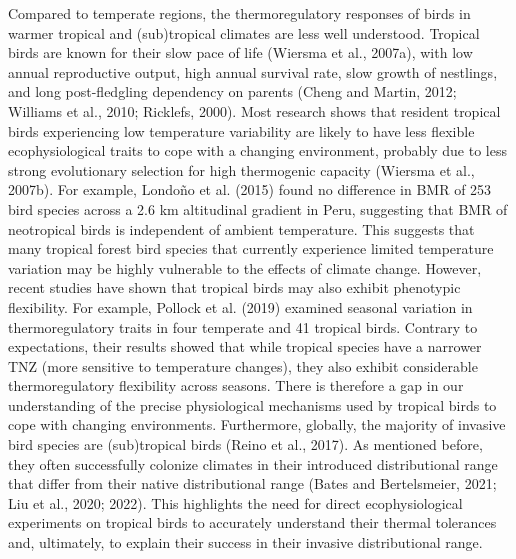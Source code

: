 \documentclass[10pt, twoside]{book} %
\begin{document}
Compared to temperate regions, the thermoregulatory responses of birds in warmer tropical and (sub)tropical climates are less well understood. Tropical birds are known for their slow pace of life (Wiersma et al., 2007a), with low annual reproductive output, high annual survival rate, slow growth of nestlings, and long post-fledgling dependency on parents (Cheng and Martin, 2012; Williams et al., 2010; Ricklefs, 2000). Most research shows that resident tropical birds experiencing low temperature variability are likely to have less flexible ecophysiological traits to cope with a changing environment, probably due to less strong evolutionary selection for high thermogenic capacity (Wiersma et al., 2007b). For example, Londoño et al. (2015) found no difference in BMR of 253 bird species across a 2.6 km altitudinal gradient in Peru, suggesting that BMR of neotropical birds is independent of ambient temperature. This suggests that many tropical forest bird species that currently experience limited temperature variation may be highly vulnerable to the effects of climate change. However, recent studies have shown that tropical birds may also exhibit phenotypic flexibility. For example, Pollock et al. (2019) examined seasonal variation in thermoregulatory traits in four temperate and 41 tropical birds. Contrary to expectations, their results showed that while tropical species have a narrower TNZ (more sensitive to temperature changes), they also exhibit considerable thermoregulatory flexibility across seasons. There is therefore a gap in our understanding of the precise physiological mechanisms used by tropical birds to cope with changing environments. Furthermore, globally, the majority of invasive bird species are (sub)tropical birds (Reino et al., 2017). As mentioned before, they often successfully colonize climates in their introduced distributional range that differ from their native distributional range (Bates and Bertelsmeier, 2021; Liu et al., 2020; 2022). This highlights the need for direct ecophysiological experiments on tropical birds to accurately understand their thermal tolerances and, ultimately, to explain their success in their invasive distributional range. \\
\end{document}
